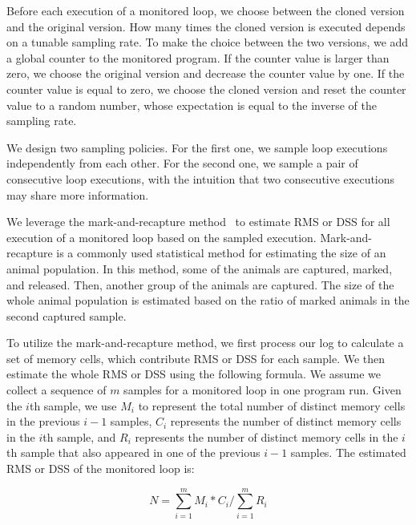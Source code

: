 Before each execution of a monitored loop, 
we choose between the cloned version and the original version. 
How many times the cloned version is executed 
depends on a tunable sampling rate. 
To make the choice between the two versions,
we add a global counter to the monitored program. 
If the counter value is larger than zero, 
we choose the original version and decrease the counter value by one.
If the counter value is equal to zero,
we choose the cloned version and reset the counter value to 
a random number, 
whose expectation is 
equal to the inverse of the sampling rate.  

We design two sampling policies. 
For the first one, we sample loop executions independently from each other.
For the second one, we sample a pair of consecutive loop executions, 
with the intuition that two consecutive 
executions may share more information.

We leverage the mark-and-recapture method~\cite{mark-recapture} to 
estimate RMS or DSS for all execution of a monitored loop 
based on the sampled execution. 
Mark-and-recapture is a commonly used statistical method 
for estimating the size of an animal population. 
In this method, some of the animals are captured, marked, and released. 
Then, another group of the animals are captured.
The size of the whole animal population is estimated 
based on the ratio of marked animals in the second captured sample.  

To utilize the mark-and-recapture method, 
we first process our log to calculate a set of memory cells, 
which contribute RMS
or DSS for each sample. 
We then estimate the whole RMS or DSS using the following formula.
We assume we collect a sequence of $m$ samples for a monitored loop 
in one program run.
Given the $i$th sample, we use $M_i$ to represent the 
total number of distinct memory cells in the previous $i-1$ samples, 
$C_i$ represents the number of distinct memory cells in the $i$th sample,
and $R_i$ represents the number of distinct memory cells in 
the $i$th sample that also appeared in one of the previous $i-1$ samples.
The estimated RMS or DSS of  the monitored loop is:

\begin{equation} \label{eq:mark}
N = \sum\limits_{i=1}^m M_i*C_i\Big/\sum\limits_{i=1}^m R_i
\end{equation}
